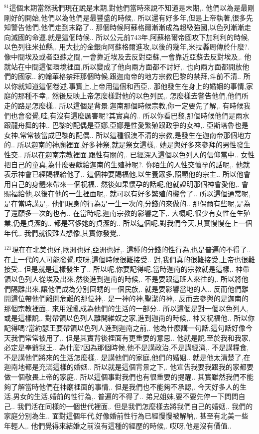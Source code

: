 \documentclass{book}
\begin{document}
$^{81}$這個末期當然我們現在說是末期,對他們當時來說不知道是末期,.
他們以為是最剛剛好的開始,他們以為他們是最豐盛的時候,.
所以還有好多年,但是上帝執著,很多先知警告他們,他們走到末路了..
那個時候阿蘇格爾漸漸成為超級強國,以色列漸漸走向滅國的命運,就是這個時候..
所以公元前743年,阿蘇格爾帝國攻下加利利的時候,以色列往米拉縣,.
用大批的金銀向阿蘇格爾進攻,以後的幾年,米拉縣周傳於什麼?.
像中間埃及或者亞蘇之間,一會靠近埃及去反對亞蘇,一會靠近亞蘇去反對埃及,.
他就站在中間這個環境裡面,所以變成了他向兩方面都不討好,.
也向兩方面都開放他們的國家..
約翰華格禁拜那個時候,跟迦南帝的地方宗教巴黎的禁拜,斗前不清..
所以你就知道這個卷述,事實上,上帝用這個和西亞,.
那他發生在身上的婚姻的事情,家庭的那種不幸,.
然後反映上帝怎麼樣對他的以色列民,.
怎麼樣去警告他們,他們所走的路是怎麼樣..
所以這個是背景.迦南那個時候宗教,你一定要先了解,.
有時候我們也會發覺,哇,有沒有這麼厲害呢?其實真的..
所以你看巴黎,那個時候他們是雨水跟龍舟舞的神,.
巴黎的配偶是亞娜,亞娜是性愛繁殖跟政爭的女神,.
亞斯塔魯也是女神,常常被當成巴黎的配偶..
所以這種很澳不清的宗教,是發生在迦南帝那個地方的..
所以迦南的神廟裡面,好多神祭,就是祭女這樣,.
她是與好多來參拜的男性發生性交..
所以在迦南宗教裡面,跟性有關的,.
已經深入這個以色列人的信仰當中..
女性把自己的童真,為什麼要獻給迦南的生殖神呢?.
你陌生的人性交懷孕的話呢,.
他就表示神會已經賜福給他了,.
這個神要賜福他,以生養眾多,照顧他的宗主..
所以他會用自己的身體來帶來一個祝福,.
然後如果懷孕的話呢,他就證明那個神會愛他,.
會賜福給他,以後在他的一生裡面呢,.
就可以有好多繁殖的機會了..
所以這個通常呢,是在當時講是,.
他們現身的行為是一生一次的,分錢的來做的..
那偶爾有些呢,是為了還願多一次的也有..
在當時呢,迦南宗教的影響之下,.
大概呢,很少有女性在生殖業,仍是貞潔的,.
都是奢侈她的貞潔的..
所以這個呢,對我們今天,其實慢慢在上一個年代,.
我們就很難去想像,其實你發覺,.

$^{121}$現在在北美也好,歐洲也好,亞洲也好,.
這種的分錢的性行為,也是普遍的不得了..
在上一代的人可能發覺,哎呀,這個時候很難接受..
對,我們真的很難接受,上帝也很難接受..
但是就是這樣發生了..
所以呢,你要記得呢,當時迦南的宗教就是這樣,.
神帶領以色列人從埃及出來,然後進到迦南的時候,.
不是要跟這班人來往的,.
所以將他們隔離出來,讓他們成為分別回甥的一個民族,.
就是要影響當地的人..
反而他們離開這位帶他們離開危難的那位神,.
是一神的神,聖潔的神,.
反而去參與的是迦南的那個宗教裡面,.
來用淫亂成為他們的生活的一部分..
所以這個是對一個以色列人,或是這樣說,.
對帶領以色列人離開維奴之家,進到迦南的時候,.
神又祝福他..
所以你記得嗎?當約瑟王要帶領以色列人進到迦南之前,.
他為什麼講一句話,這句話好像今天我們常常被用了,.
但是其實背後裡面有更重要的意思..
他就是說,至於我和我家,必定是奉爺我王..
為什麼?因為那個時候,他不是講政治,不是講經濟,.
不是講糧食,不是講他們將來的生活怎麼樣,.
是講他們的家庭,他們的婚姻..
就是他太清楚了,在迦南地都是充滿這樣的婚姻..
所以就是這個背景之下,.
他宣告我要我跟我的家都要做一個敬畏上帝的家庭..
所以這個事對我們也有很重要的提醒..
其實雖然我們不能夠了解當時他們在神廟裡面的事情,.
但是我們也不能夠不承認,.
今天好多人的生活,男女的生活,婚前的性行為,.
普遍的不得了..
弟兄姐妹,要不要先停一下問問自己..
我們活在同樣的一個世代裡面,.
但是我們怎麼樣去將我們自己的婚姻,.
我們的家庭分別為生..
面對這個年代,好像婚前性行為已經慢慢被解納,.
甚至有北美一些年輕人,.
他們覺得來結婚之前沒有這種的經歷的時候,.
哎呀,他是沒有價值..
\end{document}
